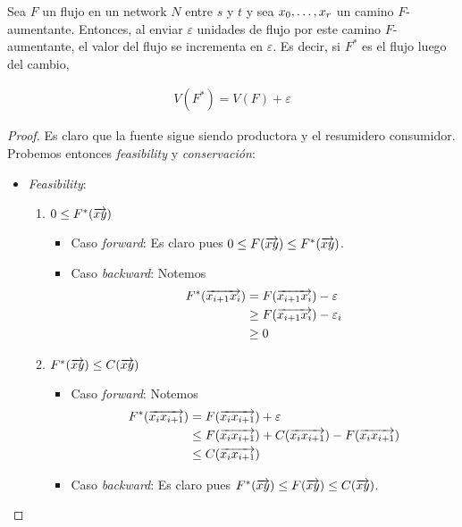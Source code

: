 \begin{lemma}\label{flujo_camino_aumentante}
  Sea $F$ un flujo en un network $N$ entre $s$ y $t$ y sea
  $x_0, \mathellipsis, x_r$ un camino $F$-aumentante.
  Entonces, al enviar $\varepsilon$ unidades de flujo por
  este camino $F$-aumentante, el valor del flujo se incrementa en
  $\varepsilon$. Es decir, si $F^*$ es el flujo luego del cambio,

  \begin{align}
    V(F^*) = V(F) + \varepsilon
  \end{align}
\end{lemma}

\begin{proof}
  Es claro que la fuente sigue siendo productora y el resumidero consumidor.
  Probemos entonces \emph{feasibility} y \emph{conservación}:
  \begin{itemize}
  \item[] \emph{Feasibility}:
    \begin{enumerate}
    \item $0 \le F^*(\overrightarrow{xy})$
      \begin{itemize}
        \item[] Caso \emph{forward}: Es claro pues $0 \le F(\overrightarrow{xy}) \le F^*(\overrightarrow{xy})$.
        \item[] Caso \emph{backward}: Notemos
          \begin{align}
            F^*(\overrightarrow{x_{i+1} x_i})
            &= F(\overrightarrow{x_{i+1} x_i}) - \varepsilon\\
            &\ge F(\overrightarrow{x_{i+1} x_i}) - \varepsilon_i\\
            &\ge 0
          \end{align}
      \end{itemize}

    \item $F^*(\overrightarrow{xy}) \le C(\overrightarrow{xy})$
      \begin{itemize}
      \item[] Caso \emph{forward}: Notemos
        \begin{align}
          F^*(\overrightarrow{x_i x_{i+1}})
          &= F(\overrightarrow{x_i x_{i+1}}) + \varepsilon\\
          &\le F(\overrightarrow{x_i x_{i+1}}) + C(\overrightarrow{x_i x_{i+1}}) - F(\overrightarrow{x_i x_{i+1}})\\
          &\le C(\overrightarrow{x_i x_{i+1}})
        \end{align}
      \item[] Caso \emph{backward}: Es claro pues
          $F^{*}(\overrightarrow{xy}) \le F(\overrightarrow{xy}) \le C(\overrightarrow{xy})$.
      \end{itemize}
    \end{enumerate}


\end{itemize}
\end{proof}
